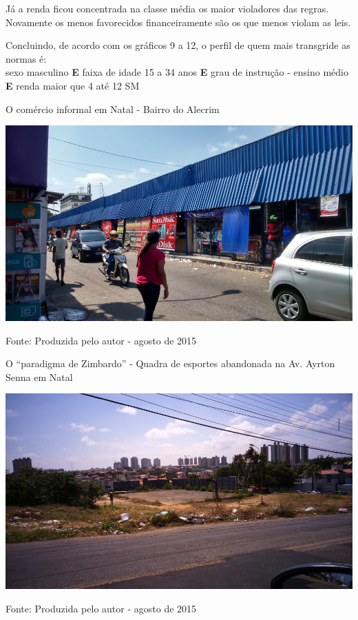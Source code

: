 \documentclass[
	12pt,				%
	openright,			%
	twoside,			%
	a4paper,			%
	chapter=TITLE,		%
	section=TITLE,		%
	subsection=TITLE,	%
	subsubsection=TITLE,%
	spanish,            %
	english,			%
	brazil				%
	]{abntex2}
\begin{document}
\FloatBarrier
\par
Já a renda ficou concentrada na classe média os maior violadores das regras. Novamente os menos favorecidos financeiramente são os que menos violam as leis.
\par
Concluindo, de acordo com os gráficos 9 a 12, o perfil de quem mais transgride as normas é:\\
sexo masculino \textbf{E} faixa de idade 15 a 34 anos \textbf{E} grau de instrução - ensino médio \textbf{E} renda maior que 4 até 12 SM
\begin{foto}[!htpb]
	\caption{\label{Foto10}O comércio informal em Natal - Bairro do Alecrim}
	\begin{center}
		\includegraphics[scale=0.20]{alecrim.png}
			\end{center}
	\ABNTEXchapterfont\small{Fonte: Produzida pelo autor - agosto de 2015}
\end{foto}
\FloatBarrier
\begin{foto}[!htpb]
	\caption{\label{Foto11}O “paradigma de Zimbardo” - Quadra de esportes abandonada na Av. Ayrton Senna em Natal}
	\begin{center}
		\includegraphics[scale=0.42]{ayrton-senna.png}
	\end{center}
	\ABNTEXchapterfont\small{Fonte: Produzida pelo autor - agosto de 2015}
\end{foto}
\FloatBarrier
\end{document}
